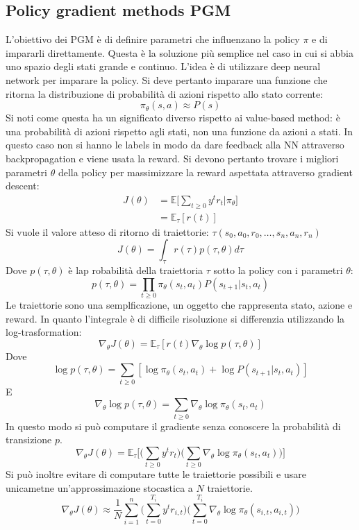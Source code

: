 	\subsection{Policy gradient methods PGM}
	L'obiettivo dei PGM \`e di definire parametri che influenzano la policy $\pi$ e di impararli direttamente.
	Questa \`e la soluzione pi\`u semplice nel caso in cui si abbia uno spazio degli stati grande e continuo.
	L'idea \`e di utilizzare deep neural network per imparare la policy.
	Si deve pertanto imparare una funzione che ritorna la distribuzione di probabilit\`a di azioni rispetto allo stato corrente:
	$$\pi_\theta(s,a)\approx P(s)$$
	Si noti come questa ha un significato diverso rispetto ai value-based method: \`e una probabilit\`a di azioni rispetto agli stati, non una funzione da azioni a stati.
	In questo caso non si hanno le labels in modo da dare feedback alla NN attraverso backpropagation e viene usata la reward.
	Si devono pertanto trovare i migliori parametri $\theta$ della policy per massimizzare la reward aspettata attraverso gradient descent:
	\begin{align*}
		J(\theta) &= \mathbb{E}\biggl[\sum\limits_{t\ge 0}y^tr_t|\pi_\theta\biggr]\\
	  		 &=\mathbb{E}_\tau[r(t)]
	\end{align*}
	Si vuole il valore atteso di ritorno di traiettorie: $\tau(s_0,a_0,r_0, \dots, s_n,a_n,r_n)$
	$$J(\theta) = \int_\tau r(\tau)p(\tau,\theta)d\tau$$
	Dove $p(\tau,\theta)$ \`e lap robabilit\`a della traiettoria $\tau$ sotto la policy con i parametri $\theta$:
	$$p(\tau,\theta) = \prod\limits_{t\ge 0}\pi_\theta(s_t,a_t)P(s_{t+1}|s_t,a_t)$$
	Le traiettorie sono una semplficazione, un oggetto che rappresenta stato, azione e reward.
	In quanto l'integrale \`e di difficile risoluzione si differenzia utilizzando la log-trasformation:
	$$\nabla_\theta J(\theta) =\mathbb{E}_\tau[r(t)\nabla_\theta\log p(\tau,\theta)]$$
	Dove
	$$\log p(\tau,\theta) = \sum\limits_{t\ge 0} [\log \pi_\theta(s_t,a_t) + \log P(s_{t+1}|s_t,a_t)]$$
	E
	$$\nabla_\theta \log p(\tau,\theta) = \sum\limits_{t\ge 0}\nabla_\theta \log\pi_\theta(s_t,a_t)$$
	In questo modo si pu\`o computare il gradiente senza conoscere la probabilit\`a di transizione $p$.
	$$\nabla_\theta J(\theta) = \mathbb{E}_\tau\biggl[\biggl(\sum\limits_{t\ge 0}y^tr_t\biggr)\biggl(\sum\limits_{t\ge 0}\nabla_\theta\log\pi_\theta(s_t,a_t)\biggr)\biggr]$$
	Si pu\`o inoltre evitare di computare tutte le traiettorie possibili e usare unicametne un'approssimazione stocastica a $N$ traiettorie.
	$$\nabla_\theta J(\theta) \approx \dfrac{1}{N}\sum\limits_{i=1}^n\biggl(\sum\limits_{t = 0}^{T_i}y^tr_{i,t}\biggr)\biggl(\sum\limits_{t= 0}^{T_i}\nabla_\theta\log\pi_\theta(s_{i,t},a_{i,t})\biggr)$$

